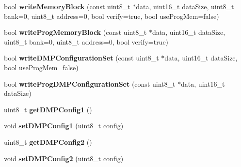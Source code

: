 \begin{DoxyCompactItemize}
\item 
\hypertarget{class_m_p_u6050_aae135772b45e1c7968b55f4f01b3757f}{bool {\bfseries write\+Memory\+Block} (const uint8\+\_\+t $\ast$data, uint16\+\_\+t data\+Size, uint8\+\_\+t bank=0, uint8\+\_\+t address=0, bool verify=true, bool use\+Prog\+Mem=false)}\label{class_m_p_u6050_aae135772b45e1c7968b55f4f01b3757f}

\item 
\hypertarget{class_m_p_u6050_a201dc0aa819f451584c575c5a7590e10}{bool {\bfseries write\+Prog\+Memory\+Block} (const uint8\+\_\+t $\ast$data, uint16\+\_\+t data\+Size, uint8\+\_\+t bank=0, uint8\+\_\+t address=0, bool verify=true)}\label{class_m_p_u6050_a201dc0aa819f451584c575c5a7590e10}

\item 
\hypertarget{class_m_p_u6050_abe4f64f68164116b2ec94fe1d987929a}{bool {\bfseries write\+D\+M\+P\+Configuration\+Set} (const uint8\+\_\+t $\ast$data, uint16\+\_\+t data\+Size, bool use\+Prog\+Mem=false)}\label{class_m_p_u6050_abe4f64f68164116b2ec94fe1d987929a}

\item 
\hypertarget{class_m_p_u6050_a160a3d018a81eb85a33874a43f44b3ea}{bool {\bfseries write\+Prog\+D\+M\+P\+Configuration\+Set} (const uint8\+\_\+t $\ast$data, uint16\+\_\+t data\+Size)}\label{class_m_p_u6050_a160a3d018a81eb85a33874a43f44b3ea}

\item 
\hypertarget{class_m_p_u6050_a421cdf4cea9fea87decbd69084ba4956}{uint8\+\_\+t {\bfseries get\+D\+M\+P\+Config1} ()}\label{class_m_p_u6050_a421cdf4cea9fea87decbd69084ba4956}

\item 
\hypertarget{class_m_p_u6050_a0126b95e4074de16bb61d9c4e4cf837f}{void {\bfseries set\+D\+M\+P\+Config1} (uint8\+\_\+t config)}\label{class_m_p_u6050_a0126b95e4074de16bb61d9c4e4cf837f}

\item 
\hypertarget{class_m_p_u6050_a29594027f88c291708a38fba67c4ecd5}{uint8\+\_\+t {\bfseries get\+D\+M\+P\+Config2} ()}\label{class_m_p_u6050_a29594027f88c291708a38fba67c4ecd5}

\item 
\hypertarget{class_m_p_u6050_aea90c3e6a6666f070f7833a913cfa821}{void {\bfseries set\+D\+M\+P\+Config2} (uint8\+\_\+t config)}\label{class_m_p_u6050_aea90c3e6a6666f070f7833a913cfa821}

\end{DoxyCompactItemize}


